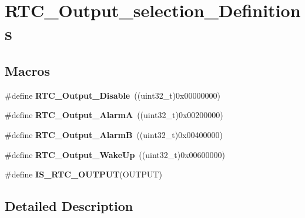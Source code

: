 \hypertarget{group___r_t_c___output__selection___definitions}{\section{R\-T\-C\-\_\-\-Output\-\_\-selection\-\_\-\-Definitions}
\label{group___r_t_c___output__selection___definitions}
}
\subsection*{Macros}
\begin{DoxyCompactItemize}
\item 
\hypertarget{group___r_t_c___output__selection___definitions_gac822a3040c6e8a503118bba51593e489}{\#define {\bfseries R\-T\-C\-\_\-\-Output\-\_\-\-Disable}~((uint32\-\_\-t)0x00000000)}\label{group___r_t_c___output__selection___definitions_gac822a3040c6e8a503118bba51593e489}

\item 
\hypertarget{group___r_t_c___output__selection___definitions_ga56386ce37ad43c8b09a07437fa248483}{\#define {\bfseries R\-T\-C\-\_\-\-Output\-\_\-\-Alarm\-A}~((uint32\-\_\-t)0x00200000)}\label{group___r_t_c___output__selection___definitions_ga56386ce37ad43c8b09a07437fa248483}

\item 
\hypertarget{group___r_t_c___output__selection___definitions_ga7fecea40e71cbadf6821bb5cc9f24e39}{\#define {\bfseries R\-T\-C\-\_\-\-Output\-\_\-\-Alarm\-B}~((uint32\-\_\-t)0x00400000)}\label{group___r_t_c___output__selection___definitions_ga7fecea40e71cbadf6821bb5cc9f24e39}

\item 
\hypertarget{group___r_t_c___output__selection___definitions_ga1a48ec12a6fc320c8e18cc0f3c89b97a}{\#define {\bfseries R\-T\-C\-\_\-\-Output\-\_\-\-Wake\-Up}~((uint32\-\_\-t)0x00600000)}\label{group___r_t_c___output__selection___definitions_ga1a48ec12a6fc320c8e18cc0f3c89b97a}

\item 
\#define {\bfseries I\-S\-\_\-\-R\-T\-C\-\_\-\-O\-U\-T\-P\-U\-T}(O\-U\-T\-P\-U\-T)
\end{DoxyCompactItemize}


\subsection{Detailed Description}


